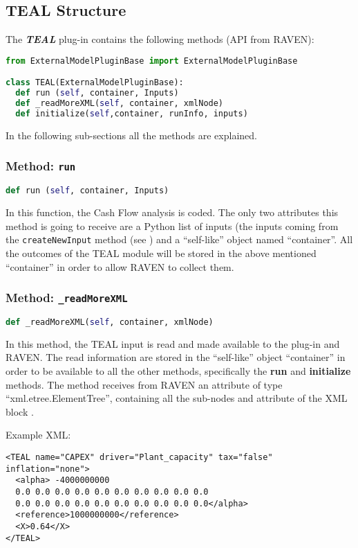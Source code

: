 \subsection{TEAL Structure}
The  \textit{\textbf{TEAL}} plug-in contains the following methods (API from RAVEN):

\begin{lstlisting}[language=python]
from ExternalModelPluginBase import ExternalModelPluginBase

class TEAL(ExternalModelPluginBase):
  def run (self, container, Inputs)
  def _readMoreXML(self, container, xmlNode)
  def initialize(self,container, runInfo, inputs)
\end{lstlisting}
In the following sub-sections all the methods are explained.
\subsubsection{Method: \texttt{run}}
\label{subsubsec:runExternalModelPlugin}
\begin{lstlisting}[language=python]
def run (self, container, Inputs)
\end{lstlisting}

In this function, the Cash Flow analysis is coded.
%
The only two attributes this method is going to receive are a Python list of inputs
(the inputs coming from the \texttt{createNewInput} method (see \cite{RAVENuserManual}) and a ``self-like'' object
named ``container''.
%
All the outcomes of the TEAL module will be stored in the above mentioned ``container'' in order to
allow RAVEN to collect them.

\subsubsection{Method: \texttt{\_readMoreXML}}
\label{subsubsec:externalReadMoreXMLExternalModelPlugin}
\begin{lstlisting}[language=python]
def _readMoreXML(self, container, xmlNode)
\end{lstlisting}
In this method, the TEAL input is read and made available to the plug-in and RAVEN.
%
The read information are stored in the ``self-like'' object ``container''
 in order to be available to all the other methods, specifically the  \textbf{run} and  \textbf{initialize} methods. 
%
The method receives from RAVEN an attribute of type ``xml.etree.ElementTree'',
containing all the sub-nodes and attribute of the XML block .
%

Example XML:
\begin{lstlisting}[style=XML,morekeywords={subType,ModuleToLoad}]
<TEAL name="CAPEX" driver="Plant_capacity" tax="false" inflation="none">
  <alpha> -4000000000
  0.0 0.0 0.0 0.0 0.0 0.0 0.0 0.0 0.0 0.0
  0.0 0.0 0.0 0.0 0.0 0.0 0.0 0.0 0.0 0.0</alpha>
  <reference>1000000000</reference>
  <X>0.64</X> 
</TEAL>
\end{lstlisting}


